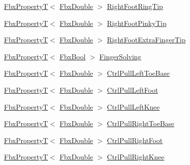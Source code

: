 \begin{DoxyCompactItemize}
\item 
\hyperlink{class_fbx_property_t}{Fbx\+PropertyT}$<$ \hyperlink{fbxtypes_8h_a171e72a1c46fc15c1a6c9c31948c1c5b}{Fbx\+Double} $>$ \hyperlink{class_fbx_character_a83ea9a50a88bc42e004b7becb3df7422}{Right\+Foot\+Ring\+Tip}
\item 
\hyperlink{class_fbx_property_t}{Fbx\+PropertyT}$<$ \hyperlink{fbxtypes_8h_a171e72a1c46fc15c1a6c9c31948c1c5b}{Fbx\+Double} $>$ \hyperlink{class_fbx_character_a180d0cf795cda71d5447d443f28c50bd}{Right\+Foot\+Pinky\+Tip}
\item 
\hyperlink{class_fbx_property_t}{Fbx\+PropertyT}$<$ \hyperlink{fbxtypes_8h_a171e72a1c46fc15c1a6c9c31948c1c5b}{Fbx\+Double} $>$ \hyperlink{class_fbx_character_a8f4fb6c7e53220e3ab256c5055742067}{Right\+Foot\+Extra\+Finger\+Tip}
\item 
\hyperlink{class_fbx_property_t}{Fbx\+PropertyT}$<$ \hyperlink{fbxtypes_8h_a92e0562b2fe33e76a242f498b362262e}{Fbx\+Bool} $>$ \hyperlink{class_fbx_character_a1d329d6b89abc23f5f966a28b1bd3194}{Finger\+Solving}
\item 
\hyperlink{class_fbx_property_t}{Fbx\+PropertyT}$<$ \hyperlink{fbxtypes_8h_a171e72a1c46fc15c1a6c9c31948c1c5b}{Fbx\+Double} $>$ \hyperlink{class_fbx_character_aa24a9e3263ff172bce43821163c202b9}{Ctrl\+Pull\+Left\+Toe\+Base}
\item 
\hyperlink{class_fbx_property_t}{Fbx\+PropertyT}$<$ \hyperlink{fbxtypes_8h_a171e72a1c46fc15c1a6c9c31948c1c5b}{Fbx\+Double} $>$ \hyperlink{class_fbx_character_a9db7ae7ce8136715096e1e561340a90f}{Ctrl\+Pull\+Left\+Foot}
\item 
\hyperlink{class_fbx_property_t}{Fbx\+PropertyT}$<$ \hyperlink{fbxtypes_8h_a171e72a1c46fc15c1a6c9c31948c1c5b}{Fbx\+Double} $>$ \hyperlink{class_fbx_character_a6e03a737caa1d54f2b91a684cacee4c6}{Ctrl\+Pull\+Left\+Knee}
\item 
\hyperlink{class_fbx_property_t}{Fbx\+PropertyT}$<$ \hyperlink{fbxtypes_8h_a171e72a1c46fc15c1a6c9c31948c1c5b}{Fbx\+Double} $>$ \hyperlink{class_fbx_character_a2300675a0feed1de9efa5a60e3037b64}{Ctrl\+Pull\+Right\+Toe\+Base}
\item 
\hyperlink{class_fbx_property_t}{Fbx\+PropertyT}$<$ \hyperlink{fbxtypes_8h_a171e72a1c46fc15c1a6c9c31948c1c5b}{Fbx\+Double} $>$ \hyperlink{class_fbx_character_ac687c6519770d52f88efad6aa79fb174}{Ctrl\+Pull\+Right\+Foot}
\item 
\hyperlink{class_fbx_property_t}{Fbx\+PropertyT}$<$ \hyperlink{fbxtypes_8h_a171e72a1c46fc15c1a6c9c31948c1c5b}{Fbx\+Double} $>$ \hyperlink{class_fbx_character_a6d0292e3a5f73f3c4c77d904e60556c7}{Ctrl\+Pull\+Right\+Knee}

\end{DoxyCompactItemize}
